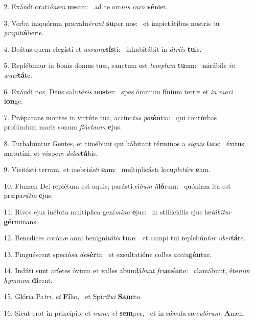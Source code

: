 2. Exáudi orati\textit{ó}\textit{nem} \textbf{me}am: \ast\  ad te om\textit{nis} \textit{ca}\textit{ro} \textbf{vé}niet.\

3. Verba iniquórum prævalu\textit{é}\textit{runt} \textbf{su}per nos: \ast\  et impietátibus nostris tu \textit{pro}\textit{pi}\textit{ti}\textbf{á}beris.\

4. Beátus quem elegísti et \textit{as}\textit{sump}\textbf{sís}ti: \ast\  inhabitábit in \textit{á}\textit{tri}\textit{is} \textbf{tu}is.\

5. Replébimur in bonis domus tuæ, sanctum est \textit{tem}\textit{plum} \textbf{tu}um: \ast\  mirábile \textit{in} \textit{æ}\textit{qui}\textbf{tá}te.\

6. Exáudi nos, Deus salu\textit{tá}\textit{ris} \textbf{nos}ter: \ast\  spes ómnium fínium terræ et \textit{in} \textit{ma}\textit{ri} \textbf{lon}ge.\

7. Prǽparans montes in virtúte tua, accínc\textit{tus} \textit{pot}\textbf{én}tia: \ast\  qui contúrbas profúndum maris sonum \textit{flúc}\textit{tu}\textit{um} \textbf{e}jus.\

8. Turbabúntur Gentes, et timébunt qui hábitant términos a \textit{si}\textit{gnis} \textbf{tu}is: \ast\  éxitus matutíni, et véspe\textit{re} \textit{de}\textit{lec}\textbf{tá}bis.\

9. Visitásti terram, et inebri\textit{ás}\textit{ti} \textbf{e}am: \ast\  multiplicásti locu\textit{ple}\textit{tá}\textit{re} \textbf{e}am.\

10. Flumen Dei replétum est aquis; parásti ci\textit{bum} \textit{il}\textbf{ló}rum: \ast\  quóniam ita est præpa\textit{rá}\textit{ti}\textit{o} \textbf{e}jus.\

11. Rivos ejus inébria multíplica gení\textit{mi}\textit{na} \textbf{e}jus: \ast\  in stillicídiis ejus læ\textit{tá}\textit{bi}\textit{tur} \textbf{gér}minans.\

12. Benedíces corónæ anni benigni\textit{tá}\textit{tis} \textbf{tu}æ: \ast\  et campi tui replebún\textit{tur} \textit{u}\textit{ber}\textbf{tá}te.\

13. Pinguéscent speció\textit{sa} \textit{de}\textbf{sér}ti: \ast\  et exsultatióne col\textit{les} \textit{ac}\textit{cin}\textbf{gén}tur.\

14. Indúti sunt aríetes óvium et valles abundá\textit{bunt} \textit{fru}\textbf{mén}to: \ast\  clamábunt, éte\textit{nim} \textit{hym}\textit{num} \textbf{di}cent.\

15. Glória Pa\textit{tri}, \textit{et} \textbf{Fí}lio, \ast\  et Spi\textit{rí}\textit{tu}\textit{i} \textbf{Sanc}to.\

16. Sicut erat in princípio, et \textit{nunc}, \textit{et} \textbf{sem}per, \ast\  et in sǽcula sæ\textit{cu}\textit{ló}\textit{rum}. \textbf{A}men.\

